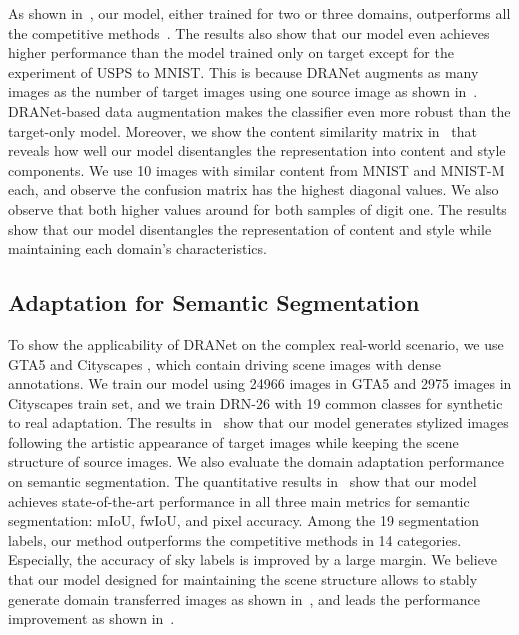 \documentclass[final]{cvpr}
\begin{document}
As shown in~, our model, either trained for two or three domains, outperforms all the competitive methods~\cite{ye2020light, hoffman2018cycada, bousmalis2017unsupervised, liu2016coupled, tzeng2017adversarial, bousmalis2016domain, ganin2016domain}.
The results also show that our model even achieves higher performance than the model trained only on target except for the experiment of USPS to MNIST.
This is because DRANet augments as many images as the number of target images using one source image as shown in~.
DRANet-based data augmentation makes the classifier even more robust than the target-only model.
Moreover, we show the content similarity matrix in~ that reveals how well our model disentangles the representation into content and style components.
We use 10 images with similar content from MNIST and MNIST-M each, and observe the confusion matrix has the highest diagonal values.
We also observe that both higher values around  for both samples of digit one.
The results show that our model disentangles the representation of content and style while maintaining each domain's characteristics.















\subsection{Adaptation for Semantic Segmentation}
\label{sec:driving}
To show the applicability of DRANet on the complex real-world scenario, we use GTA5 \cite{richter2016playing} and Cityscapes \cite{cordts2016cityscapes}, which contain driving scene images with dense annotations.
We train our model using 24966 images in GTA5 and 2975 images in Cityscapes train set, and we train DRN-26 \cite{yu2017dilated} with 19 common classes for synthetic to real adaptation.
The results in~ show that our model generates stylized images following the artistic appearance of target images while keeping the scene structure of source images.
We also evaluate the domain adaptation performance on semantic segmentation. 
The quantitative results in~ show that our model achieves state-of-the-art performance in all three main metrics for semantic segmentation: mIoU, fwIoU, and pixel accuracy.
Among the 19 segmentation labels, our method outperforms the competitive methods in 14 categories.
Especially, the accuracy of sky labels is improved by a large margin.
We believe that our model designed for maintaining the scene structure allows to stably generate domain transferred images as shown in~, and leads the performance improvement as shown in~.
 
\end{document}

